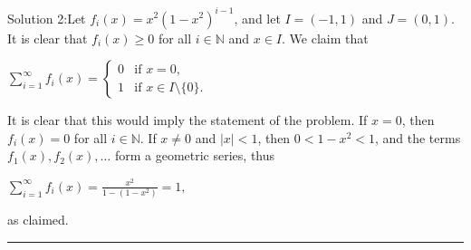 \documentclass{article}
\begin{document}
Solution 2:Let \(\displaystyle  f_i(x) = x^2 (1 - x^2)^{i - 1} \), and let \(\displaystyle  I = (-1, 1) \) and \(\displaystyle  J = (0, 1) \). It is clear that \(\displaystyle  f_i(x) \geq 0 \) for all \(\displaystyle  i \in \mathbb{N} \) and \(\displaystyle  x \in I \). We claim that

\(\displaystyle 
\sum_{i=1}^\infty f_i(x) = \begin{cases}
0 & \text{if } x = 0, \\
1 & \text{if } x \in I \setminus \{0\}.
\end{cases}
\)

It is clear that this would imply the statement of the problem. If \(\displaystyle  x = 0 \), then \(\displaystyle  f_i(x) = 0 \) for all \(\displaystyle  i \in \mathbb{N} \). If \(\displaystyle  x \neq 0 \) and \(\displaystyle  |x| < 1 \), then \(\displaystyle  0 < 1 - x^2 < 1 \), and the terms \(\displaystyle  f_1(x), f_2(x), \ldots \) form a geometric series, thus

\(\displaystyle 
\sum_{i=1}^\infty f_i(x) = \frac{x^2}{1 - (1 - x^2)} = 1,
\)

as claimed.

\vspace{1em}
\hrule
\vspace{1em}
\end{document}
